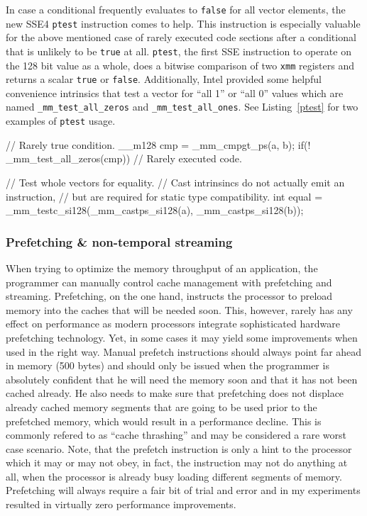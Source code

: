 In case a conditional frequently evaluates to \texttt{false} for all vector elements, the new SSE4 \texttt{ptest} instruction comes to help. This instruction is especially valuable for the above mentioned case of rarely executed code sections after a conditional that is unlikely to be \texttt{true} at all. \texttt{ptest}, the first SSE instruction to operate on the 128 bit value as a whole, does a bitwise comparison of two \texttt{xmm} registers and returns a scalar \texttt{true} or \texttt{false}. Additionally, Intel provided some helpful convenience intrinsics that test a vector for ``all 1'' or ``all 0'' values which are named \texttt{\_mm\_test\_all\_zeros} and \texttt{\_mm\_test\_all\_ones}. See Listing~\ref{ptest} for two examples of \texttt{ptest} usage.

\begin{code}[caption={Examples of \texttt{ptest} usage},label=ptest]
// Rarely true condition.
__m128 cmp = _mm_cmpgt_ps(a, b);
if(! _mm_test_all_zeros(cmp)) {
  // Rarely executed code.
}

// Test whole vectors for equality.
// Cast intrinsincs do not actually emit an instruction,
// but are required for static type compatibility.
int equal = _mm_testc_si128(_mm_castps_si128(a), _mm_castps_si128(b));
\end{code}

\subsubsection{Prefetching \& non-temporal streaming}

When trying to optimize the memory throughput of an application, the programmer can manually control cache management with prefetching and streaming. Prefetching, on the one hand, instructs the processor to preload memory into the caches that will be needed soon. This, however, rarely has any effect on performance as modern processors integrate sophisticated hardware prefetching technology. Yet, in some cases it may yield some improvements when used in the right way. Manual prefetch instructions should always point far ahead in memory (\eg{}500 bytes) and should only be issued when the programmer is absolutely confident that he will need the memory soon and that it has not been cached already. He also needs to make sure that prefetching does not displace already cached memory segments that are going to be used prior to the prefetched memory, which would result in a performance decline. This is commonly refered to as ``cache thrashing'' and may be considered a rare worst case scenario. Note, that the prefetch instruction is only a hint to the processor which it may or may not obey, in fact, the instruction may not do anything at all, when the processor is already busy loading different segments of memory. Prefetching will always require a fair bit of trial and error and in my experiments resulted in virtually zero performance improvements.

